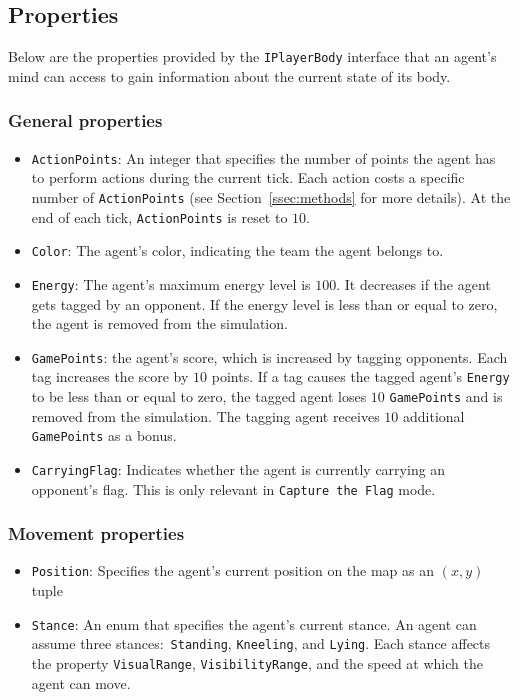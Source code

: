 \documentclass[a4paper,english,DIV=16,11pt,parskip=half,dvipsnames,listof=totoc,index=totoc,bibliography=totoc]{scrartcl}
\begin{document}
\subsection{Properties} \label{ssec:props}
Below are the properties provided by the \texttt{IPlayerBody} interface that an agent's mind can access to gain information about the current state of its body.
%
\subsubsection{General properties} \label{sssec:genAttr}
\begin{itemize}
  \item \texttt{ActionPoints}: An integer that specifies the number of points the agent has to perform actions during the current tick. Each action costs a specific number of \texttt{ActionPoints} (see Section~\ref{ssec:methods} for more details). At the end of each tick, \texttt{ActionPoints} is reset to $10$.
  \item \texttt{Color}: The agent's color, indicating the team the agent belongs to.
  \item \texttt{Energy}: The agent's maximum energy level is $100$. It decreases if the agent gets tagged by an opponent. If the energy level is less than or equal to zero, the agent is removed from the simulation.
  \item \texttt{GamePoints}: the agent's score, which is increased by tagging opponents. Each tag increases the score by $10$ points. If a tag causes the tagged agent's \texttt{Energy} to be less than or equal to zero, the tagged agent loses $10$ \texttt{GamePoints} and is removed from the simulation. The tagging agent receives $10$ additional \texttt{GamePoints} as a bonus.
  \item \texttt{CarryingFlag}: Indicates whether the agent is currently carrying an opponent's flag. This is only relevant in \texttt{Capture the Flag} mode.
\end{itemize}
%
\subsubsection{Movement properties} \label{sssec:movAttr}
\begin{itemize}
  \item \texttt{Position}: Specifies the agent's current position on the map as an $(x,y)$ tuple
  \item \texttt{Stance}: An enum that specifies the agent's current stance. An agent can assume three stances:~\texttt{Standing}, \texttt{Kneeling}, and \texttt{Lying}. Each stance affects the property \texttt{VisualRange}, \texttt{VisibilityRange}, and the speed at which the agent can move.
\end{itemize}
%
\end{document}
